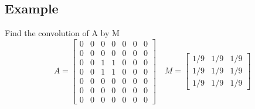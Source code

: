 \documentclass{article}[18pt]
\begin{document}
\subsection{Example}
Find the convolution of A by M
\[
A=\left[\begin{array}{lllllll}{0} & {0} & {0} & {0} & {0} & {0} & {0} \\ {0} & {0} & {0} & {0} & {0} & {0} & {0} \\ {0} & {0} & {1} & {1} & {0} & {0} & {0} \\ {0} & {0} & {1} & {1} & {0} & {0} & {0} \\ {0} & {0} & {0} & {0} & {0} & {0} & {0} \\ {0} & {0} & {0} & {0} & {0} & {0} & {0} \\ {0} & {0} & {0} & {0} & {0} & {0} & {0}\end{array}\right] \quad M=\left[\begin{array}{ccc}{1 / 9} & {1 / 9} & {1 / 9} \\ {1 / 9} & {1 / 9} & {1 / 9} \\ {1 / 9} & {1 / 9} & {1 / 9}\end{array}\right]
\]
\end{document}
